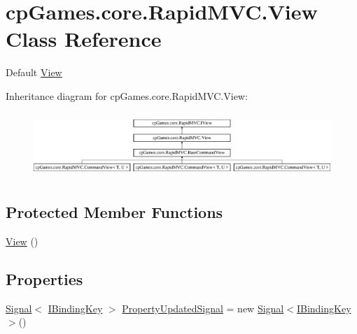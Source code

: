 \hypertarget{classcp_games_1_1core_1_1_rapid_m_v_c_1_1_view}{}\section{cp\+Games.\+core.\+Rapid\+M\+V\+C.\+View Class Reference}
\label{classcp_games_1_1core_1_1_rapid_m_v_c_1_1_view}


Default \mbox{\hyperlink{classcp_games_1_1core_1_1_rapid_m_v_c_1_1_view}{View}}  


Inheritance diagram for cp\+Games.\+core.\+Rapid\+M\+V\+C.\+View\+:\begin{figure}[H]
\begin{center}
\leavevmode
\includegraphics[height=2.472406cm]{classcp_games_1_1core_1_1_rapid_m_v_c_1_1_view}
\end{center}
\end{figure}
\subsection*{Protected Member Functions}
\begin{DoxyCompactItemize}
\item 
\mbox{\hyperlink{classcp_games_1_1core_1_1_rapid_m_v_c_1_1_view_a40db8f93a7952a91c90183ded2f44640}{View}} ()
\end{DoxyCompactItemize}
\subsection*{Properties}
\begin{DoxyCompactItemize}
\item 
\mbox{\hyperlink{classcp_games_1_1core_1_1_rapid_m_v_c_1_1_signal}{Signal}}$<$ \mbox{\hyperlink{interfacecp_games_1_1core_1_1_rapid_m_v_c_1_1_i_binding_key}{I\+Binding\+Key}} $>$ \mbox{\hyperlink{classcp_games_1_1core_1_1_rapid_m_v_c_1_1_view_ab8e01d990df4516ff4591df6277edf63}{Property\+Updated\+Signal}} = new \mbox{\hyperlink{classcp_games_1_1core_1_1_rapid_m_v_c_1_1_signal}{Signal}}$<$\mbox{\hyperlink{interfacecp_games_1_1core_1_1_rapid_m_v_c_1_1_i_binding_key}{I\+Binding\+Key}}$>$()
\end{DoxyCompactItemize}


